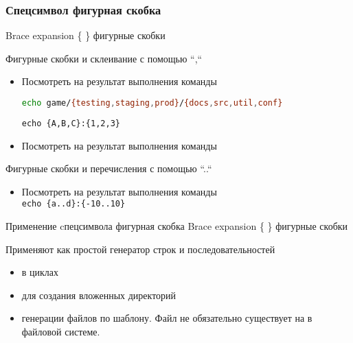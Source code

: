 \begin{frame}[fragile]
	\frametitle{Спецсимвол фигурная скобка}
    Brace expansion  \alert{\{ \}} фигурные скобки

	\begin{block}{Фигурные скобки и склеивание с помощью ``,``}
		\begin{itemize}
			\item Посмотреть на результат выполнения команды \\
\begin{lstlisting}[language=bash]
echo game/{testing,staging,prod}/{docs,src,util,conf}
\end{lstlisting}
				{\tt echo \{A,B,C\}:\{1,2,3\}}
				\pause
			\item Посмотреть на результат выполнения команды 
		\end{itemize}
	\end{block}


	\pause

	\begin{block}{Фигурные скобки и перечисления с помощью ``..``}
		\begin{itemize}
			\item Посмотреть на результат выполнения команды \\
				{\tt echo \{a..d\}:\{-10..10\}}
		\end{itemize}
	\end{block}

\end{frame}

\begin{frame}{Применение cпецсимвола фигурная скобка}
    Brace expansion  \alert{\{ \}} фигурные скобки

Применяют как простой генератор строк и последовательностей
\begin{itemize}
    \item в циклах 
    \item для создания вложенных директорий 
    \item генерации файлов по шаблону. Файл не обязательно существует на в файловой системе.
\end{itemize}
\end{frame}
